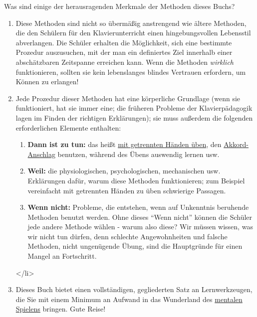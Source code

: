 Was sind einige der herausragenden Merkmale der Methoden dieses Buchs?

\begin{enumerate}[label={\arabic*.}] 
\item Diese Methoden sind nicht so übermäßig anstrengend wie ältere Methoden, die den Schülern für den Klavierunterricht einen hingebungsvollen Lebensstil abverlangen.
Die Schüler erhalten die Möglichkeit, sich eine bestimmte Prozedur auszusuchen, mit der man ein definiertes Ziel innerhalb einer abschätzbaren Zeitspanne erreichen kann.
Wenn die Methoden \textit{wirklich} funktionieren, sollten sie kein lebenslanges blindes Vertrauen erfordern, um Können zu erlangen!

\item Jede Prozedur dieser Methoden hat eine körperliche Grundlage (wenn sie funktioniert, hat sie immer eine; die früheren Probleme der Klavierpädagogik lagen im Finden der richtigen Erklärungen); sie muss außerdem die folgenden erforderlichen Elemente enthalten:

\begin{enumerate}[label={\alph*.}] 
<li>\textbf{Ziel:} Techniken, die erworben werden sollen, das heißt wenn Sie nicht schnell genug oder keine Triller spielen können, wenn Sie auswendig spielen möchten, usw.

\item \textbf{Dann ist zu tun:} das heißt \hyperref[c1ii7]{mit getrennten Händen üben}, den \hyperref[c1ii9]{Akkord-Anschlag} benutzen, während des Übens auswendig lernen usw.

\item \textbf{Weil:} die physiologischen, psychologischen, mechanischen usw. Erklärungen dafür, warum diese Methoden funktionieren; zum Beispiel vereinfacht mit getrennten Händen zu üben schwierige Passagen.

\item \textbf{Wenn nicht:} Probleme, die entstehen, wenn auf Unkenntnis beruhende Methoden benutzt werden.
Ohne dieses \enquote{Wenn nicht} können die Schüler jede andere Methode wählen - warum also diese?
Wir müssen wissen, was wir nicht tun dürfen, denn schlechte Angewohnheiten und falsche Methoden, nicht ungenügende Übung, sind die Hauptgründe für einen Mangel an Fortschritt.


 \end{enumerate}
</li>
\item 
Dieses Buch bietet einen vollständigen, gegliederten Satz an Lernwerkzeugen, die Sie mit einem Minimum an Aufwand in das Wunderland des \hyperref[c1ii12mental]{mentalen Spielens} bringen.
Gute Reise!

 \end{enumerate}


